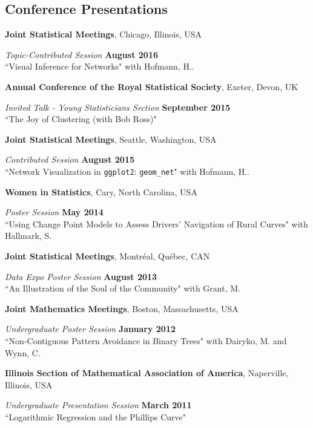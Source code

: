 \documentclass[margin,line]{res}
\begin{document}
\begin{resume}
\section{\sc Conference Presentations} 

{\bf Joint Statistical Meetings}, Chicago, Illinois, USA

\vspace{-.3cm}
{\em Topic-Contributed Session} \hfill {\bf August 2016}\\
``Visual Inference for Networks" with Hofmann, H..


{\bf Annual Conference of the Royal Statistical Society}, Exeter, Devon, UK

\vspace{-.3cm}
{\em Invited Talk - Young Statisticians Section} \hfill {\bf September 2015}\\
``The Joy of Clustering (with Bob Ross)" 


{\bf Joint Statistical Meetings}, Seattle, Washington, USA

\vspace{-.3cm}
{\em Contributed Session} \hfill {\bf August 2015}\\
``Network Visualization in \texttt{ggplot2}: \texttt{geom\_net}" with Hofmann, H..

{\bf Women in Statistics}, Cary, North Carolina, USA

\vspace{-.3cm}
{\em Poster Session} \hfill {\bf May 2014}\\
``Using Change Point Models to Assess Drivers' Navigation of Rural Curves" with Hallmark, S.

{\bf Joint Statistical Meetings}, Montr\'{e}al, Qu\'{e}bec, CAN

\vspace{-.3cm}
{\em Data Expo Poster Session} \hfill {\bf August 2013}\\
``An Illustration of the Soul of the Community" with Grant, M.  

{\bf Joint Mathematics Meetings}, Boston, Massachusetts, USA

\vspace{-.3cm}
{\em Undergraduate Poster Session} \hfill {\bf January 2012}\\
``Non-Contiguous Pattern Avoidance in Binary Trees" with Dairyko, M. and Wynn, C. 

{\bf Illinois Section of Mathematical Association of America}, Naperville, Illinois, USA

\vspace{-.3cm}
{\em Undergraduate Presentation Session} \hfill {\bf March 2011}\\
``Logarithmic Regression and the Phillips Curve" 



\end{resume}
\end{document}
